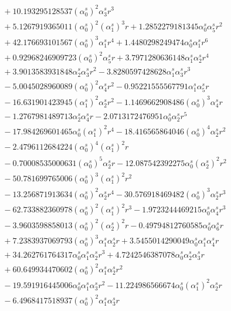 \documentclass[10pt]{article}
\begin{document}
\begin{align*}
&{}  + 10.193295128537 \left(\alpha_{0}^s\right)^{2} \alpha_{3}^s r^{3} \\
&{}  + 5.1267919365011 \left(\alpha_{0}^s\right)^{2} \left(\alpha_{1}^s\right)^{3} r + 1.2852279181345 \alpha_{0}^s \alpha_{5}^s r^{2} \\
&{}  + 42.176693101567 \left(\alpha_{0}^s\right)^{3} \alpha_{1}^s r^{4} + 1.4480298249474 \alpha_{0}^s \alpha_{1}^s r^{6} \\
&{}  + 0.92968246909723 \left(\alpha_{0}^s\right)^{2} \alpha_{5}^s r + 3.7971280636148 \alpha_{1}^s \alpha_{2}^s r^{4} \\
&{}  + 3.9013583931848 \alpha_{2}^s \alpha_{3}^s r^{2} - 3.8280597428628 \alpha_{1}^s \alpha_{3}^s r^{3} \\
&{}  - 5.0045028960089 \left(\alpha_{0}^s\right)^{2} \alpha_{4}^s r^{2} - 0.95221555567791 \alpha_{1}^s \alpha_{5}^s r \\
&{}  - 16.631901423945 \left(\alpha_{1}^s\right)^{2} \alpha_{2}^s r^{2} - 1.1469662908486 \left(\alpha_{0}^s\right)^{3} \alpha_{4}^s r \\
&{}  - 1.2767981489713 \alpha_{2}^s \alpha_{4}^s r - 2.0713172476951 \alpha_{0}^s \alpha_{2}^s r^{5} \\
&{}  - 17.984269601465 \alpha_{0}^s \left(\alpha_{1}^s\right)^{2} r^{4} - 18.416565864046 \left(\alpha_{0}^s\right)^{4} \alpha_{2}^s r^{2} \\
&{}  - 2.4796112684224 \left(\alpha_{0}^s\right)^{4} \left(\alpha_{1}^s\right)^{2} r \\
&{}  - 0.70008535000631 \left(\alpha_{0}^s\right)^{5} \alpha_{2}^s r - 12.087542392275 \alpha_{0}^s \left(\alpha_{2}^s\right)^{2} r^{2} \\
&{}  - 50.781699765006 \left(\alpha_{0}^s\right)^{3} \left(\alpha_{1}^s\right)^{2} r^{2} \\
&{}  - 13.256871913634 \left(\alpha_{0}^s\right)^{2} \alpha_{2}^s r^{4} - 30.576918469482 \left(\alpha_{0}^s\right)^{3} \alpha_{2}^s r^{3} \\
&{}  - 62.733882360978 \left(\alpha_{0}^s\right)^{2} \left(\alpha_{1}^s\right)^{2} r^{3} - 1.9723244469215 \alpha_{0}^s \alpha_{4}^s r^{3} \\
&{}  - 3.9603598858013 \left(\alpha_{0}^s\right)^{2} \left(\alpha_{2}^s\right)^{2} r - 0.49794812760585 \alpha_{0}^s \alpha_{6}^s r \\
&{}  + 7.2383937069793 \left(\alpha_{0}^s\right)^{3} \alpha_{1}^s \alpha_{2}^s r + 3.5455014290049 \alpha_{0}^s \alpha_{1}^s \alpha_{4}^s r \\
&{}  + 34.262761764317 \alpha_{0}^s \alpha_{1}^s \alpha_{2}^s r^{3} + 4.7242546387078 \alpha_{0}^s \alpha_{2}^s \alpha_{3}^s r \\
&{}  + 60.649934470602 \left(\alpha_{0}^s\right)^{2} \alpha_{1}^s \alpha_{2}^s r^{2} \\
&{}  - 19.591916445006 \alpha_{0}^s \alpha_{1}^s \alpha_{3}^s r^{2} - 11.224986566674 \alpha_{0}^s \left(\alpha_{1}^s\right)^{2} \alpha_{2}^s r \\
&{}  - 6.4968417518937 \left(\alpha_{0}^s\right)^{2} \alpha_{1}^s \alpha_{3}^s r
\end{align*}
\end{document}
